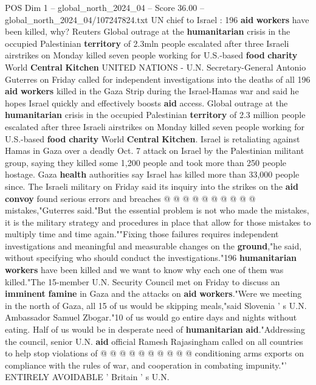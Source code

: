 \begin{textsample}{POS Dim 1 – global\_north\_2024\_04 – Score 36.00 – global\_north\_2024\_04/107247824.txt}  \label{ex:f1_pos_200}
UN chief to Israel : 196 \textbf{aid} \textbf{workers} have been killed, why?
Reuters Global outrage at the \textbf{humanitarian} crisis in the occupied Palestinian \textbf{territory} of 2.3mln people escalated after three Israeli airstrikes on Monday killed seven people working for U.S.-based \textbf{food} \textbf{charity} World \textbf{Central} \textbf{Kitchen} UNITED NATIONS - U.N.
Secretary-General Antonio Guterres on Friday called for independent investigations into the deaths of all 196 \textbf{aid} \textbf{workers} killed in the Gaza Strip during the Israel-Hamas war and said he hopes Israel quickly and effectively boosts \textbf{aid} access.
Global outrage at the \textbf{humanitarian} crisis in the occupied Palestinian \textbf{territory} of 2.3 million people escalated after three Israeli airstrikes on Monday killed seven people working for U.S.-based \textbf{food} \textbf{charity} World \textbf{Central} \textbf{Kitchen}.
Israel is retaliating against Hamas in Gaza over a deadly Oct. 7 attack on Israel by the Palestinian militant group, saying they killed some 1,200 people and took more than 250 people hostage.
Gaza \textbf{health} authorities say Israel has killed more than 33,000 people since.
The Israeli military on Friday said its inquiry into the strikes on the \textbf{aid} \textbf{convoy} found serious errors and breaches @ @ @ @ @ @ @ @ @ @ mistakes,"Guterres said."But the essential problem is not who made the mistakes, it is the military strategy and procedures in place that allow for those mistakes to multiply time and time again.""Fixing those failures requires independent investigations and meaningful and measurable changes on the \textbf{ground},"he said, without specifying who should conduct the investigations."196 \textbf{humanitarian} \textbf{workers} have been killed and we want to know why each one of them was killed."The 15-member U.N.
Security Council met on Friday to discuss an \textbf{imminent} \textbf{famine} in Gaza and the attacks on \textbf{aid} \textbf{workers}."Were we meeting in the north of Gaza, all 15 of us would be skipping meals,"said Slovenia ' s U.N.
Ambassador Samuel Zbogar."10 of us would go entire days and nights without eating.
Half of us would be in desperate need of \textbf{humanitarian} \textbf{aid}."Addressing the council, senior U.N. \textbf{aid} official Ramesh Rajasingham called on all countries to help stop violations of @ @ @ @ @ @ @ @ @ @ conditioning arms exports on compliance with the rules of war, and cooperation in combating impunity."' ENTIRELY AVOIDABLE ' Britain ' s U.N.

\end{textsample}
